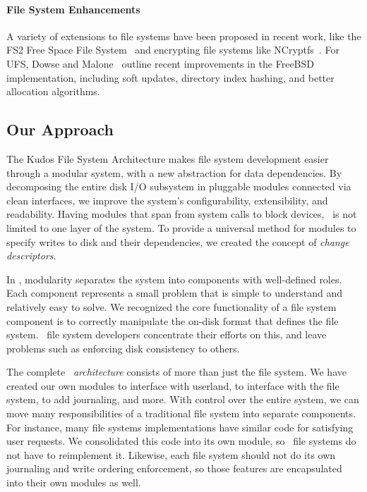 \paragraph{File System Enhancements}

A variety of extensions to file systems have been proposed in recent work, like
the FS2 Free Space File System~\cite{huang05fs2} and encrypting file systems
like NCryptfs~\cite{wright01ncryptfs}. For UFS, Dowse and
Malone~\cite{dowse02recent} outline recent improvements in the FreeBSD
implementation, including soft updates, directory index hashing, and better
allocation algorithms.

\subsection{Our Approach}

The Kudos File System Architecture makes file system development easier
through a modular system, with a new abstraction for data dependencies.
By decomposing the entire disk I/O subsystem in pluggable modules connected via
clean interfaces, we improve the system's configurability, extensibility, and
readability. Having modules that span from system calls to block devices,
\Kudos\ is not limited to one layer of the system. To provide a universal
method for modules to specify writes to disk and their dependencies, we
created the concept of \emph{change descriptors}.

In \Kudos, modularity separates the system into components with well-defined
roles. Each component represents a small problem that is simple to understand
and relatively easy to solve. We recognized the core functionality of a file
system component is to correctly manipulate the on-disk format that defines
the file system. \Kudos\ file system developers concentrate their efforts on
this, and leave problems such as enforcing disk consistency to others.

The complete \Kudos\ \emph{architecture} consists of more than just the file
system. We have created our own modules to interface with userland, to
interface with the file system, to add journaling, and more. With control
over the entire system, we can move many responsibilities of a traditional
file system into separate components. For instance, many file systems
implementations have similar code for satisfying user requests. We
consolidated this code into its own module, so \Kudos\ file systems do not have
to reimplement it. Likewise, each file system should not do its own journaling
and write ordering enforcement, so those features are encapsulated into their
own modules as well.

